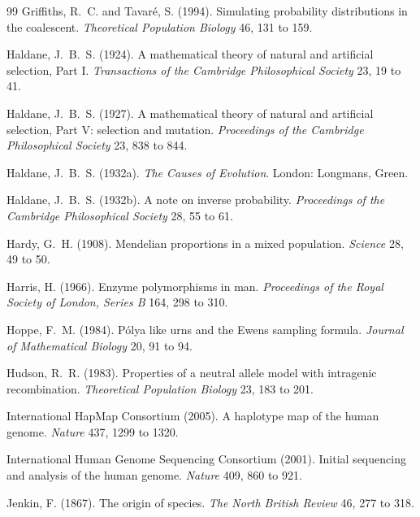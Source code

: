 \begin{thebibliography}{99}
Griffiths, R.~C. and Tavar\'e, S. (1994). Simulating probability distributions in the coalescent.
\emph{Theoretical Population Biology} 46, 131 to 159.

Haldane, J.~B.~S. (1924). A mathematical theory of natural and artificial selection, Part I.
\emph{Transactions of the Cambridge Philosophical Society} 23, 19 to 41.

Haldane, J.~B.~S. (1927). A mathematical theory of natural and artificial selection, Part V:
selection and mutation. \emph{Proceedings of the Cambridge Philosophical Society} 23, 838 to 844.

Haldane, J.~B.~S. (1932a). \emph{The Causes of Evolution}. London: Longmans, Green.

Haldane, J.~B.~S. (1932b). A note on inverse probability. \emph{Proceedings of the Cambridge
Philosophical Society} 28, 55 to 61.

Hardy, G.~H. (1908). Mendelian proportions in a mixed population. \emph{Science} 28, 49 to 50.

Harris, H. (1966). Enzyme polymorphisms in man. \emph{Proceedings of the Royal Society of London,
Series B} 164, 298 to 310.

Hoppe, F.~M. (1984). P\'olya like urns and the Ewens sampling formula. \emph{Journal of
Mathematical Biology} 20, 91 to 94.

Hudson, R.~R. (1983). Properties of a neutral allele model with intragenic recombination.
\emph{Theoretical Population Biology} 23, 183 to 201.

International HapMap Consortium (2005). A haplotype map of the human genome. \emph{Nature} 437,
1299 to 1320.

International Human Genome Sequencing Consortium (2001). Initial sequencing and analysis of the
human genome. \emph{Nature} 409, 860 to 921.

Jenkin, F. (1867). The origin of species. \emph{The North British Review} 46, 277 to 318.


\end{thebibliography}
